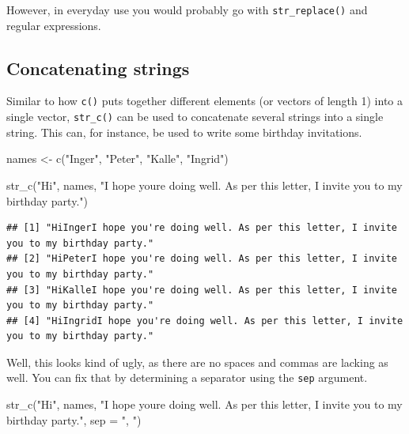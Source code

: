\documentclass[
]{book}
\newenvironment{Shaded}{\begin{snugshade}}{\end{snugshade}}
\newcommand{\AttributeTok}[1]{\textcolor[rgb]{0.77,0.63,0.00}{#1}}
\newcommand{\FunctionTok}[1]{\textcolor[rgb]{0.00,0.00,0.00}{#1}}
\newcommand{\NormalTok}[1]{#1}
\newcommand{\OtherTok}[1]{\textcolor[rgb]{0.56,0.35,0.01}{#1}}
\newcommand{\StringTok}[1]{\textcolor[rgb]{0.31,0.60,0.02}{#1}}
\begin{document}
However, in everyday use you would probably go with \texttt{str\_replace()} and regular expressions.

\hypertarget{concatenating-strings}{%
\subsection{Concatenating strings}\label{concatenating-strings}}

Similar to how \texttt{c()} puts together different elements (or vectors of length 1) into a single vector, \texttt{str\_c()} can be used to concatenate several strings into a single string. This can, for instance, be used to write some birthday invitations.

\begin{Shaded}
\begin{Highlighting}[]
\NormalTok{names }\OtherTok{\textless{}{-}} \FunctionTok{c}\NormalTok{(}\StringTok{"Inger"}\NormalTok{, }\StringTok{"Peter"}\NormalTok{, }\StringTok{"Kalle"}\NormalTok{, }\StringTok{"Ingrid"}\NormalTok{)}

\FunctionTok{str\_c}\NormalTok{(}\StringTok{"Hi"}\NormalTok{, names, }\StringTok{"I hope you\textquotesingle{}re doing well. As per this letter, I invite you to my birthday party."}\NormalTok{)}
\end{Highlighting}
\end{Shaded}

\begin{verbatim}
## [1] "HiIngerI hope you're doing well. As per this letter, I invite you to my birthday party." 
## [2] "HiPeterI hope you're doing well. As per this letter, I invite you to my birthday party." 
## [3] "HiKalleI hope you're doing well. As per this letter, I invite you to my birthday party." 
## [4] "HiIngridI hope you're doing well. As per this letter, I invite you to my birthday party."
\end{verbatim}

Well, this looks kind of ugly, as there are no spaces and commas are lacking as well. You can fix that by determining a separator using the \texttt{sep} argument.

\begin{Shaded}
\begin{Highlighting}[]
\FunctionTok{str\_c}\NormalTok{(}\StringTok{"Hi"}\NormalTok{, names, }\StringTok{"I hope you\textquotesingle{}re doing well. As per this letter, I invite you to my birthday party."}\NormalTok{, }\AttributeTok{sep =} \StringTok{", "}\NormalTok{)}
\end{Highlighting}
\end{Shaded}
\end{document}
